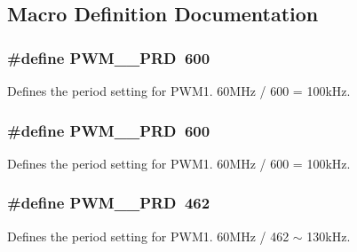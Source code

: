 \subsection{Macro Definition Documentation}
\hypertarget{a00038_a4d7cfbafe2831b32ac69043fe2a51d1f}{
\subsubsection[{P\-W\-M\-\_\-1\-\_\-\-P\-R\-D}]{\setlength{\rightskip}{0pt plus 5cm}\#define P\-W\-M\-\_\-\_\-\-P\-R\-D~600}}\label{a00038_a4d7cfbafe2831b32ac69043fe2a51d1f}
Defines the period setting for P\-W\-M1. 60\-M\-Hz / 600 = 100k\-Hz. \hypertarget{a00038_a446b4ce74c284aad70100e3f7fecffa0}{
\subsubsection[{P\-W\-M\-\_\-2\-\_\-\-P\-R\-D}]{\setlength{\rightskip}{0pt plus 5cm}\#define P\-W\-M\-\_\-\_\-\-P\-R\-D~600}}\label{a00038_a446b4ce74c284aad70100e3f7fecffa0}
Defines the period setting for P\-W\-M1. 60\-M\-Hz / 600 = 100k\-Hz. \hypertarget{a00038_a11feddb81d3d7f2f6e001b77685a1f60}{
\subsubsection[{P\-W\-M\-\_\-3\-\_\-\-P\-R\-D}]{\setlength{\rightskip}{0pt plus 5cm}\#define P\-W\-M\-\_\-\_\-\-P\-R\-D~462}}\label{a00038_a11feddb81d3d7f2f6e001b77685a1f60}
Defines the period setting for P\-W\-M1. 60\-M\-Hz / 462 $\sim$ 130k\-Hz. 

